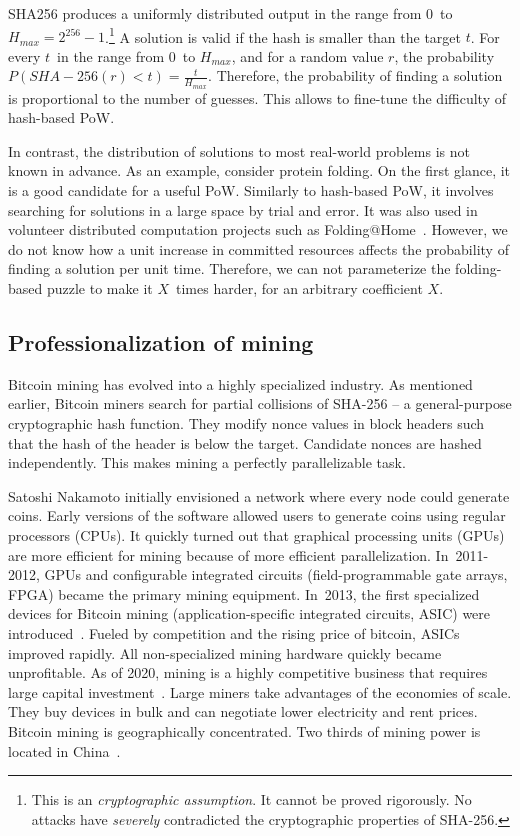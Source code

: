 SHA256 produces a uniformly distributed output in the range from $0$~to $H_{max} = 2^{256}-1$.\footnote{This is an \textit{cryptographic assumption}. It cannot be proved rigorously. No attacks have \textit{severely} contradicted the cryptographic properties of SHA-256.}
A solution is valid if the hash is smaller than the target $t$.
For every $t$~in the range from $0$~to $H_{max}$, and for a random value $r$, the probability $P(SHA-256(r) < t) = \frac{t}{H_{max}}$.
Therefore, the probability of finding a solution is proportional to the number of guesses.
This allows to fine-tune the difficulty of hash-based PoW.

In contrast, the distribution of solutions to most real-world problems is not known in advance.
As an example, consider protein folding.
On the first glance, it is a good candidate for a useful PoW.
Similarly to hash-based PoW, it involves searching for solutions in a large space by trial and error.
It was also used in volunteer distributed computation projects such as Folding@Home~\cite{Beberg2009}.
However, we do not know how a unit increase in committed resources affects the probability of finding a solution per unit time.
Therefore, we can not parameterize the folding-based puzzle to make it $X$~times harder, for an arbitrary coefficient $X$.


\subsection{Professionalization of mining}

Bitcoin mining has evolved into a highly specialized industry.
As mentioned earlier, Bitcoin miners search for partial collisions of SHA-256 -- a general-purpose cryptographic hash function.
They modify nonce values in block headers such that the hash of the header is below the target.
Candidate nonces are hashed independently.
This makes mining a perfectly parallelizable task.

Satoshi Nakamoto initially envisioned a network where every node could generate coins.
Early versions of the software allowed users to generate coins using regular processors (CPUs).
It quickly turned out that graphical processing units (GPUs) are more efficient for mining because of more efficient parallelization.
In~2011-2012, GPUs and configurable integrated circuits (field-programmable gate arrays, FPGA) became the primary mining equipment.
In~2013, the first specialized devices for Bitcoin mining (application-specific integrated circuits, ASIC) were introduced~\cite{Kim2020}.
Fueled by competition and the rising price of bitcoin, ASICs improved rapidly.
All non-specialized mining hardware quickly became unprofitable.
As of 2020, mining is a highly competitive business that requires large capital investment~\cite{Kroll2013}.
Large miners take advantages of the economies of scale.
They buy devices in bulk and can negotiate lower electricity and rent prices.
Bitcoin mining is geographically concentrated.
Two thirds of mining power is located in China~\cite{Rauchs2020}.

